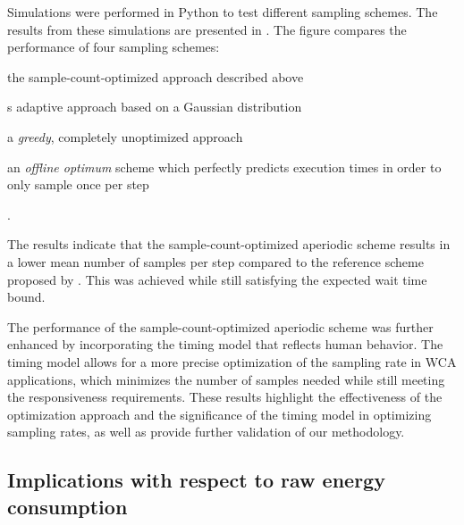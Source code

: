 Simulations were performed in Python to test different sampling schemes.
The results from these simulations are presented in .
The figure compares the performance of four sampling schemes:
\begin{inlineenum}
    \item the sample-count-optimized approach described above
    \item \citeauthor{wang2019towards}s adaptive approach based on a Gaussian distribution
    \item a \emph{greedy}, completely unoptimized approach
    \item an \emph{offline optimum} scheme which perfectly predicts execution times in order to only sample once per step
\end{inlineenum}.

The results indicate that the sample-count-optimized aperiodic scheme results in a lower mean number of samples per step compared to the reference scheme proposed by \citeauthor{wang2019towards}.
This was achieved while still satisfying the expected wait time bound.

The performance of the sample-count-optimized aperiodic scheme was further enhanced by incorporating the timing model that reflects human behavior.
The timing model allows for a more precise optimization of the sampling rate in \gls{WCA} applications, which minimizes the number of samples needed while still meeting the responsiveness requirements.
These results highlight the effectiveness of the optimization approach and the significance of the timing model in optimizing sampling rates, as well as provide further validation of our methodology.


\subsection{Implications with respect to raw energy consumption}\label{ssec:implications:energy}

